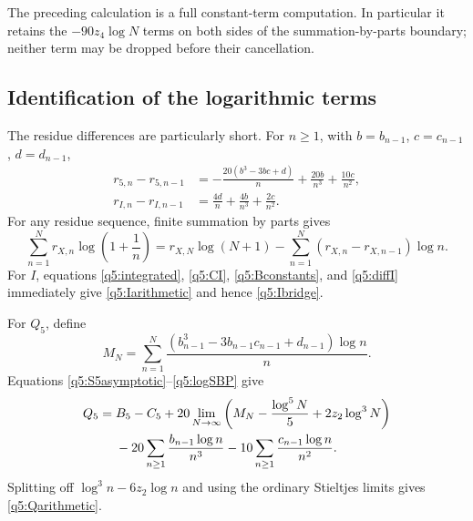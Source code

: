 \documentclass[11pt,a4paper]{article}
\numberwithin{equation}{section}
\theoremstyle{definition}
\begin{document}
The preceding calculation is a full constant-term computation.  In
particular it retains the $-90z_4\log N$ terms on both sides of
the summation-by-parts boundary; neither term may be dropped before
their cancellation.

\subsection{Identification of the logarithmic terms}

The residue differences are particularly short.  For $n\geq1$,
with $b=b_{n-1}$, $c=c_{n-1}$, $d=d_{n-1}$,
\begin{align}
 r_{5,n}-r_{5,n-1}
    &=-\frac{20(b^3-3bc+d)}n+\frac{20b}{n^3}
                              +\frac{10c}{n^2},
      \label{q5:diff5}\\
 r_{I,n}-r_{I,n-1}
    &=\frac{4d}n+\frac{4b}{n^3}+\frac{2c}{n^2}.
      \label{q5:diffI}
\end{align}
For any residue sequence, finite summation by parts gives
\begin{equation}\label{q5:logSBP}
 \sum_{n=1}^Nr_{X,n}\log\left(1+\frac1n\right)
  =r_{X,N}\log(N+1)
       -\sum_{n=1}^N(r_{X,n}-r_{X,n-1})\log n.
\end{equation}
For $I$, equations \eqref{q5:integrated}, \eqref{q5:CI},
\eqref{q5:Bconstants}, and \eqref{q5:diffI} immediately give
\eqref{q5:Iarithmetic} and hence \eqref{q5:Ibridge}.

For $Q_5$, define
\[
 M_N=\sum_{n=1}^N\frac{(b_{n-1}^3-3b_{n-1}c_{n-1}+d_{n-1})\log n}{n}.
\]
Equations \eqref{q5:S5asymptotic}--\eqref{q5:logSBP} give
\begin{align}\label{q5:limit}
 Q_5={}&B_5-C_5+
       20\lim_{N\to\infty}
          \left(M_N-\frac{\log^5N}{5}+2z_2\log^3N\right)\notag\\
 &-20\sum_{n\geq1}\frac{b_{n-1}\log n}{n^3}
       -10\sum_{n\geq1}\frac{c_{n-1}\log n}{n^2}.
\end{align}
Splitting off $\log^3n-6z_2\log n$ and using the ordinary
Stieltjes limits gives \eqref{q5:Qarithmetic}.
\end{document}
